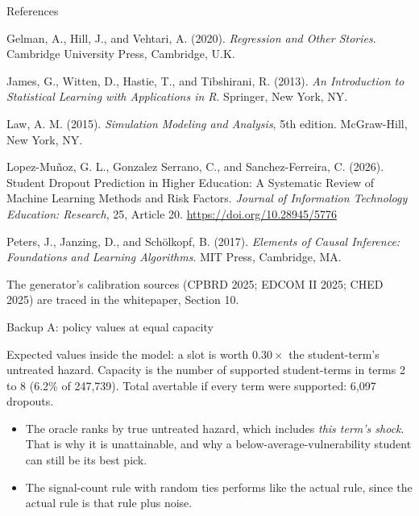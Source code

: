 \documentclass[aspectratio=169,11pt]{beamer}
\begin{document}
\begin{frame}{References}
\footnotesize
{%
\setlength{\leftskip}{1.5em}%
\setlength{\parindent}{-1.5em}%
\setlength{\parskip}{4pt}%
Gelman, A., Hill, J., and Vehtari, A. (2020). \emph{Regression and Other Stories}. Cambridge University Press, Cambridge, U.K.

James, G., Witten, D., Hastie, T., and Tibshirani, R. (2013). \emph{An Introduction to Statistical Learning with Applications in R}. Springer, New York, NY.

Law, A. M. (2015). \emph{Simulation Modeling and Analysis}, 5th edition. McGraw-Hill, New York, NY.

Lopez-Mu\~noz, G. L., Gonzalez Serrano, C., and Sanchez-Ferreira, C. (2026). Student Dropout Prediction in Higher Education: A Systematic Review of Machine Learning Methods and Risk Factors. \emph{Journal of Information Technology Education: Research}, 25, Article 20. \url{https://doi.org/10.28945/5776}

Peters, J., Janzing, D., and Sch\"olkopf, B. (2017). \emph{Elements of Causal Inference: Foundations and Learning Algorithms}. MIT Press, Cambridge, MA.\par
}

\vspace{2mm}
{\scriptsize The generator's calibration sources (CPBRD 2025; EDCOM II 2025; CHED 2025) are traced in the whitepaper, Section 10.}
\end{frame}

\appendix
\begin{frame}{Backup A: policy values at equal capacity}
\centering\footnotesize
\par
\vspace{2mm}

\raggedright
{\footnotesize Expected values inside the model: a slot is worth $0.30\times$ the student-term's untreated hazard. Capacity is the number of supported student-terms in terms 2 to 8 (6.2\% of 247,739). Total avertable if every term were supported: 6,097 dropouts.}
\vspace{3mm}

\begin{itemize}\small\setlength\itemsep{2pt}
\item The oracle ranks by true untreated hazard, which includes \emph{this term's shock}. That is why it is unattainable, and why a below-average-vulnerability student can still be its best pick.
\item The signal-count rule with random ties performs like the actual rule, since the actual rule is that rule plus noise.
\end{itemize}
\end{frame}
\end{document}
